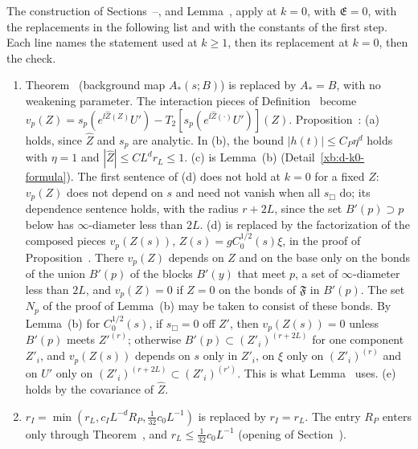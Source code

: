 
\begin{detail}[Proposition~\Nref{prop:first-step}: the adaptations at $k=0$]\label{xb:d-k0-list}
The construction of Sections~--, and Lemma~, apply at $k=0$, with $\mathfrak E=0$, with the replacements in the following list and with the constants of the first step. Each line names the statement used at $k\ge1$, then its replacement at $k=0$, then the check.
\begin{enumerate}[label=(\arabic*)]
\item Theorem~ (background map $A_*(s;B)$) is replaced by $A_*=B$, with no weakening parameter. The interaction pieces of Definition~ become $v_p(Z)=s_p(e^{\ii\hat Z(Z)}U')-T_2[s_p(e^{\ii\hat Z(\cdot)}U')](Z)$. Proposition~: (a) holds, since $\hat Z$ and $s_p$ are analytic. In (b), the bound $|h(t)|\le C_P\eta^d$ holds with $\eta=1$ and $|\hat Z|\le CL^dr_L\le1$. (c) is Lemma~(b) (Detail~\ref{xb:d-k0-formula}). The first sentence of (d) does not hold at $k=0$ for a fixed $Z$: $v_p(Z)$ does not depend on $s$ and need not vanish when all $s_\Box$ do; its dependence sentence holds, with the radius $r+2L$, since the set $B'(p)\supset p$ below has $\infty$-diameter less than $2L$. (d) is replaced by the factorization of the composed pieces $v_p(Z(s))$, $Z(s)=gC_0^{1/2}(s)\xi$, in the proof of Proposition~. There $v_p(Z)$ depends on $Z$ and on the base only on the bonds of the union $B'(p)$ of the blocks $B'(y)$ that meet $p$, a set of $\infty$-diameter less than $2L$, and $v_p(Z)=0$ if $Z=0$ on the bonds of $\mathfrak F$ in $B'(p)$. The set $N_p$ of the proof of Lemma~(b) may be taken to consist of these bonds. By Lemma~(b) for $C_0^{1/2}(s)$, if $s_\Box=0$ off $Z'$, then $v_p(Z(s))=0$ unless $B'(p)$ meets $Z'^{(r)}$; otherwise $B'(p)\subset(Z'_i)^{(r+2L)}$ for one component $Z'_i$, and $v_p(Z(s))$ depends on $s$ only in $Z'_i$, on $\xi$ only on $(Z'_i)^{(r)}$ and on $U'$ only on $(Z'_i)^{(r+2L)}\subset(Z'_i)^{(r')}$. This is what Lemma~ uses. (e) holds by the covariance of $\hat Z$.
\item $r_I=\min(r_L,c_IL^{-d}R_P,\frac1{32}c_0L^{-1})$ is replaced by $r_I=r_L$. The entry $R_P$ enters only through Theorem~, and $r_L\le\frac1{32}c_0L^{-1}$ (opening of Section~).

\end{enumerate}
\end{detail}
